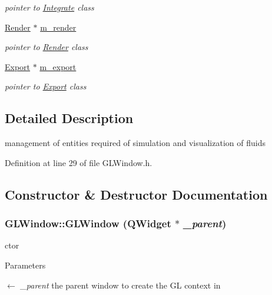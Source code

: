 \begin{DoxyCompactItemize}
\begin{DoxyCompactList}\small\item\em pointer to \hyperlink{class_integrate}{Integrate} class \item\end{DoxyCompactList}\item 
\hyperlink{class_render}{Render} $\ast$ \hyperlink{class_g_l_window_a165764f9295fafbca46560937898c839}{m\_\-render}
\begin{DoxyCompactList}\small\item\em pointer to \hyperlink{class_render}{Render} class \item\end{DoxyCompactList}\item 
\hyperlink{class_export}{Export} $\ast$ \hyperlink{class_g_l_window_aa8a9e9361c985761d51de5af16b24981}{m\_\-export}
\begin{DoxyCompactList}\small\item\em pointer to \hyperlink{class_export}{Export} class \item\end{DoxyCompactList}\end{DoxyCompactItemize}


\subsection{Detailed Description}
management of entities required of simulation and visualization of fluids 

Definition at line 29 of file GLWindow.h.



\subsection{Constructor \& Destructor Documentation}
\hypertarget{class_g_l_window_a8dfc33113be0a86a53ddbea054f75292}{
\subsubsection[{GLWindow}]{\setlength{\rightskip}{0pt plus 5cm}GLWindow::GLWindow (QWidget $\ast$ {\em \_\-parent})}}
\label{class_g_l_window_a8dfc33113be0a86a53ddbea054f75292}


ctor 


\begin{DoxyParams}{Parameters}
\item[\mbox{$\leftarrow$} {\em \_\-parent}]the parent window to create the GL context in \end{DoxyParams}


